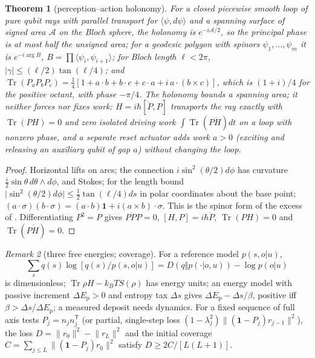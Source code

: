\documentclass[aps,pra,onecolumn,superscriptaddress,nofootinbib,10pt]{revtex4-2}
\newtheorem{theorem}{Theorem}
\theoremstyle{definition}
\theoremstyle{remark}
\newtheorem{remark}[theorem]{Remark}
\newcommand{\tr}{\operatorname{Tr}}
\newcommand{\ip}[2]{\langle #1,#2\rangle}
\begin{document}
\begin{theorem}[perception--action holonomy]\label{thm:fmberry}
For a closed piecewise smooth loop of pure qubit rays with parallel transport for $\ip\psi{d\psi}$ and a spanning
surface of signed area $\mathcal A$ on the Bloch sphere, the holonomy is $e^{-i\mathcal A/2}$, so the principal phase is at most half the
unsigned area; for a geodesic polygon with spinors $\psi_1,\dots,\psi_m$ it is $e^{-i\arg B}$, $B=\prod\ip{\psi_i}{\psi_{i+1}}$; for Bloch length $\ell<2\pi$,
$\lvert\gamma\rvert\le(\ell/2)\tan(\ell/4)$; and $\tr(P_aP_bP_c)=\tfrac14[1+a\cdot b+b\cdot c+c\cdot a+i\,a\cdot(b\times c)]$, which is $(1+i)/4$ for the positive octant,
with phase $-\pi/4$.  \emph{The holonomy bounds a spanning area; it neither forces nor fixes work}: $H=i\hbar[\dot P,P]$
transports the ray exactly with $\tr(PH)=0$ and zero isolated driving work $\int\tr(P\dot H)dt$ on a loop with
nonzero phase, and a separate reset actuator adds work $a>0$ (exciting and releasing an auxiliary qubit of
gap $a$) without changing the loop.
\end{theorem}
\begin{proof}
Horizontal lifts on arcs; the connection $i\sin^2(\theta/2)d\phi$ has curvature $\tfrac i2\sin\theta\,d\theta\wedge d\phi$, and Stokes; for the length bound
$\lvert\sin^2(\theta/2)d\phi\rvert\le\tfrac12\tan(\ell/4)ds$ in polar coordinates about the base point; $(a\cdot\sigma)(b\cdot\sigma)=(a\cdot b)\mathbf1+i(a\times b)\cdot\sigma$.  This is the
spinor form of the excess of \cite[Thm.~9.9, Cor.~9.11]{PaperI}
\cite{n2-pancharatnam,n2-berry,n2-simon,n2-sb}.  Differentiating $P^2=P$ gives $P\dot PP=0$, $[H,P]=i\hbar\dot P$, $\tr(PH)=0$ and
$\tr(P\dot H)=0$.
\end{proof}

\begin{remark}[three free energies; coverage]\label{rem:fmenergies}
For a reference model $p(s,o|u)$,
\[
\textstyle\sum_sq(s)\log[q(s)/p(s,o|u)]=D(q\Vert p(\cdot|o,u))-\log p(o|u)
\]
is dimensionless; $\tr\rho H-k_BTS(\rho)$ has energy units; an energy model with passive increment $\Delta E_{\mathrm p}>0$ and entropy tax $\Delta s$ gives $\Delta E_{\mathrm p}-\Delta s/\beta$, positive iff $\beta>\Delta s/\Delta E_{\mathrm p}$; a
measured deposit needs dynamics.  For a fixed sequence of full axis tests $P_j=n_jn_j^{\mathsf T}$ (or partial, single-step loss
$(1-\lambda_j^2)\lVert(\mathbf1-P_j)r_{j-1}\rVert^2$), the loss $D=\lVert r_0\rVert^2-\lVert r_L\rVert^2$ and the initial coverage $C=\sum_{j\le L}\lVert(\mathbf1-P_j)r_0\rVert^2$ satisfy $D\ge2C/[L(L+1)]$.
\end{remark}
\end{document}
